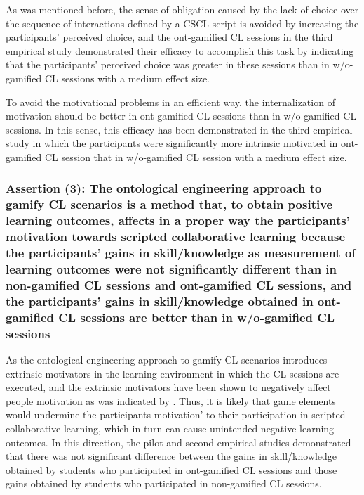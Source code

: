 As was mentioned before, the sense of obligation caused by the lack of choice over the sequence of interactions defined by a CSCL script is avoided by increasing the participants' perceived choice, and the ont-gamified CL sessions in the third empirical study demonstrated their efficacy to accomplish this task by indicating that the participants' perceived choice  was greater in these sessions than in w/o-gamified CL sessions with a medium effect size.

To avoid the motivational problems in an efficient way, the internalization of motivation should be better in ont-gamified CL sessions than in w/o-gamified CL sessions.
In this sense, this efficacy has been demonstrated in the third empirical study in which the participants were significantly more intrinsic motivated in ont-gamified CL session that in w/o-gamified CL session with a medium effect size.

\subsubsection*{Assertion (3): The ontological engineering approach to gamify CL scenarios is a method that, to obtain positive learning outcomes, affects in a proper way the participants' motivation towards scripted collaborative learning because the participants' gains in skill/knowledge as measurement of learning outcomes were not significantly different than in non-gamified CL sessions and ont-gamified CL sessions, and the participants' gains in skill/knowledge obtained in ont-gamified CL sessions are better than in w/o-gamified CL sessions}

As the ontological engineering approach to gamify CL scenarios introduces extrinsic motivators in the learning environment in which the CL sessions are executed, and the extrinsic motivators have been shown to negatively affect people motivation as was indicated by .
Thus, it is likely that game elements would undermine the participants motivation' to their participation in scripted collaborative learning, which in turn can cause unintended negative learning outcomes.
In this direction, the pilot and second empirical studies demonstrated that there was not significant difference between the gains in skill/knowledge obtained by students who participated in ont-gamified CL sessions and those gains obtained by students who participated in non-gamified CL sessions.

